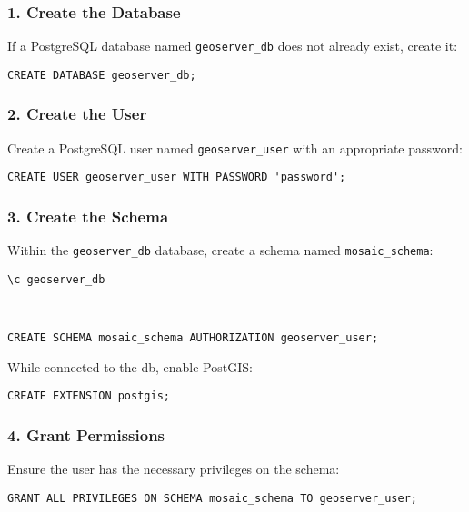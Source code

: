 \documentclass{article}
\begin{document}
\subsubsection*{1. Create the Database}

If a PostgreSQL database named \texttt{geoserver\_db} does not already exist, create it:

\begin{verbatim}
CREATE DATABASE geoserver_db;
\end{verbatim}

\subsubsection*{2. Create the User}

Create a PostgreSQL user named \texttt{geoserver\_user} with an appropriate password:

\begin{verbatim}
CREATE USER geoserver_user WITH PASSWORD 'password';
\end{verbatim}

\subsubsection*{3. Create the Schema}

Within the \texttt{geoserver\_db} database, create a schema named \texttt{mosaic\_schema}: \\

\begin{verbatim}
\c geoserver_db 
\end{verbatim}

\\
\begin{verbatim}
CREATE SCHEMA mosaic_schema AUTHORIZATION geoserver_user;
\end{verbatim} 

While connected to the db, enable PostGIS: 

\begin{verbatim}
CREATE EXTENSION postgis;
\end{verbatim}


\subsubsection*{4. Grant Permissions}

Ensure the user has the necessary privileges on the schema:

\begin{verbatim}
GRANT ALL PRIVILEGES ON SCHEMA mosaic_schema TO geoserver_user;
\end{verbatim}
\end{document}
